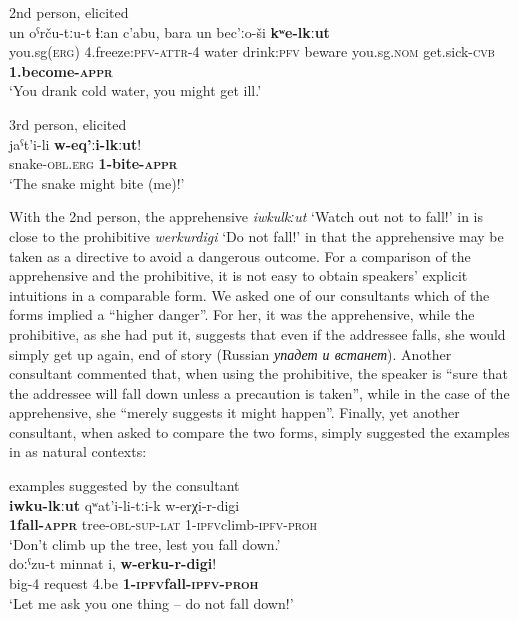 \documentclass[output=paper,colorlinks,citecolor=brown]{langscibook}
\begin{document}
\ea \label{ex:DD4} \textnormal{2nd person, elicited} \\
\gll un oˁrču-tːu-t ɬːan c'abu, bara un bec'ːo-ši \textbf{kʷe-lkːut} \\
you.sg\textsc{(erg)} 4.freeze:\textsc{pfv-attr-4} water drink:\textsc{pfv} beware you.sg\textsc{.nom} get.sick-\textsc{cvb} \textbf{1.become-\textsc{appr}} \\
\glt `You drank cold water, you might get ill.'
\z

\ea \label{ex:DD5} \textnormal{3rd person, elicited}\\
\gll jaˁt'i-li \textbf{w-eq'ːi-lkːut}! \\
snake-\textsc{obl.erg} \textbf{1-bite-\textsc{appr}} \\
\glt `The snake might bite (me)!'
\z


 With the 2nd person, the apprehensive \textit{iwkulkːut} `Watch out not to fall!' in  is close to the prohibitive \textit{werkurdigi} `Do not fall!' in that the apprehensive may be taken as a directive to avoid a dangerous outcome. For a comparison of the apprehensive and the prohibitive, it is not easy to obtain speakers' explicit intuitions in a comparable form. We asked one of our consultants which of the forms implied a ``higher danger''. For her, it was the apprehensive, while the prohibitive, as she had put it, suggests that even if the addressee falls, she would simply get up again, end of story (Russian \textit{упадет и встанет}). Another consultant commented that, when using the prohibitive, the speaker is ``sure that the addressee will fall down unless a precaution is taken'', while in the case of the apprehensive, she ``merely suggests it might happen''. Finally, yet another consultant, when asked to compare the two forms, simply suggested the examples in  as natural contexts:



\ea \label{ex:DD6} \textnormal{examples suggested by the consultant} \\
\ea \label{ex:DD6a}
\gll \textbf{i{\textlangle}w{\textrangle}ku-lkːut} qʷat'i-li-tːi-k w-e{\textlangle}r{\textrangle}χi-r-digi \\
\textbf{{\textlangle}1{\textrangle}fall-\textsc{appr}} tree-\textsc{obl-sup-lat} 1-{\textlangle}\textsc{ipfv}{\textrangle}climb-\textsc{ipfv-proh} \\
\glt `Don't climb up the tree, lest you fall down.' \\
\ex \label{ex:DD6b}
\gll doːˁzu-t minnat i, \textbf{ w-e{\textlangle}r{\textrangle}ku-r-digi}! \\
big-4 request 4.be \textbf{ 1-{\textlangle}\textsc{ipfv}{\textrangle}fall-\textsc{ipfv-proh}} \\
\glt `Let me ask you one thing -- do not fall down!'
\z
\z
\end{document}
